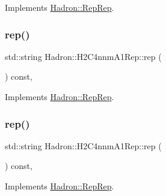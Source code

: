 Implements \mbox{\hyperlink{structHadron_1_1RepRep_ab3213025f6de249f7095892109575fde}{Hadron\+::\+Rep\+Rep}}.

\mbox{\label{structHadron_1_1H2C4nnmA1Rep_ab84ffb9381f49b933c6c3fdf5936fa92}} 
\subsubsection{\texorpdfstring{rep()}{rep()}\hspace{0.1cm}{\footnotesize\ttfamily [2/5]}}
{\footnotesize\ttfamily std\+::string Hadron\+::\+H2\+C4nnm\+A1\+Rep\+::rep (\begin{DoxyParamCaption}{ }\end{DoxyParamCaption}) const\hspace{0.3cm}{\ttfamily [inline]}, {\ttfamily [virtual]}}



Implements \mbox{\hyperlink{structHadron_1_1RepRep_ab3213025f6de249f7095892109575fde}{Hadron\+::\+Rep\+Rep}}.

\mbox{\label{structHadron_1_1H2C4nnmA1Rep_ab84ffb9381f49b933c6c3fdf5936fa92}} 
\subsubsection{\texorpdfstring{rep()}{rep()}\hspace{0.1cm}{\footnotesize\ttfamily [3/5]}}
{\footnotesize\ttfamily std\+::string Hadron\+::\+H2\+C4nnm\+A1\+Rep\+::rep (\begin{DoxyParamCaption}{ }\end{DoxyParamCaption}) const\hspace{0.3cm}{\ttfamily [inline]}, {\ttfamily [virtual]}}



Implements \mbox{\hyperlink{structHadron_1_1RepRep_ab3213025f6de249f7095892109575fde}{Hadron\+::\+Rep\+Rep}}.

\mbox{\label{structHadron_1_1H2C4nnmA1Rep_ab84ffb9381f49b933c6c3fdf5936fa92}} 
